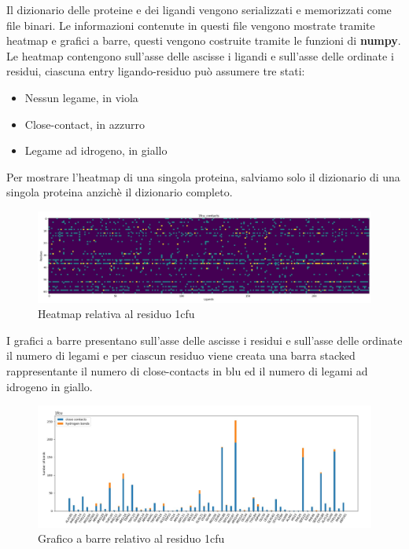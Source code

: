 Il dizionario delle proteine e dei ligandi vengono serializzati e memorizzati come file binari.\newline
Le informazioni contenute in questi file vengono mostrate tramite heatmap e grafici a barre, questi vengono costruite tramite le funzioni di \textbf{numpy}.\newline
Le heatmap contengono sull'asse delle ascisse i ligandi e sull'asse delle ordinate i residui, ciascuna entry ligando-residuo può assumere tre stati:

\begin{itemize}
    \item Nessun legame, in viola
    \item Close-contact, in azzurro
    \item Legame ad idrogeno, in giallo 
\end{itemize}

Per mostrare l'heatmap di una singola proteina, salviamo solo il dizionario di una singola proteina anzichè il dizionario completo.\newline

\begin{figure}[H]
    \centering
    \includegraphics[scale=0.4]{immagini/capitolo3/heatmap.jpg}
    \caption{Heatmap relativa al residuo 1cfu}
    \label{fig:heatmap}
\end{figure}

I grafici a barre presentano sull'asse delle ascisse i residui e sull'asse delle ordinate il numero di legami e per ciascun residuo viene creata una barra stacked rappresentante il numero di close-contacts in blu ed il numero di legami ad idrogeno in giallo.

\begin{figure}[H]
    \centering
    \includegraphics[scale=0.5]{immagini/capitolo3/interactions.jpg}
    \caption{Grafico a barre relativo al residuo 1cfu}
    \label{fig:interactions}
\end{figure}

